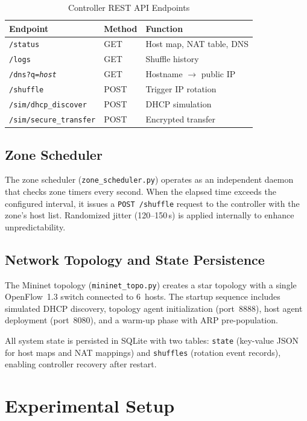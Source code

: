 \documentclass[conference]{IEEEtran}
\begin{document}
\begin{table}[htbp]
\caption{Controller REST API Endpoints}
\label{tab:api}
\centering
\footnotesize
\begin{tabular}{lll}
\toprule
\textbf{Endpoint} & \textbf{Method} & \textbf{Function} \\
\midrule
\texttt{/status} & GET & Host map, NAT table, DNS \\
\texttt{/logs} & GET & Shuffle history \\
\texttt{/dns?q=\textit{host}} & GET & Hostname $\rightarrow$ public IP \\
\texttt{/shuffle} & POST & Trigger IP rotation \\
\texttt{/sim/dhcp\_discover} & POST & DHCP simulation \\
\texttt{/sim/secure\_transfer} & POST & Encrypted transfer \\
\bottomrule
\end{tabular}
\end{table}

\subsection{Zone Scheduler}

The zone scheduler (\texttt{zone\_scheduler.py}) operates as an independent daemon that checks zone timers every second. When the elapsed time exceeds the configured interval, it issues a \texttt{POST /shuffle} request to the controller with the zone's host list. Randomized jitter (120--150\,s) is applied internally to enhance unpredictability.

\subsection{Network Topology and State Persistence}

The Mininet topology (\texttt{mininet\_topo.py}) creates a star topology with a single OpenFlow~1.3 switch connected to 6~hosts. The startup sequence includes simulated DHCP discovery, topology agent initialization (port~8888), host agent deployment (port~8080), and a warm-up phase with ARP pre-population.

All system state is persisted in SQLite with two tables: \texttt{state} (key-value JSON for host maps and NAT mappings) and \texttt{shuffles} (rotation event records), enabling controller recovery after restart.

\section{Experimental Setup}
\end{document}
